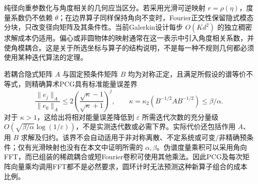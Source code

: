 纯径向重参数化与角度相关的几何应当区分。若采用光滑可逆映射 $r=\rho(\eta)$，度量系数仍不依赖 $\theta$；在边界算子同样保持角向不变时，Fourier正交性保留隐式模态分块，只改变径向矩阵及其条件性。当前Galerkin设计每步 $O(Kd^2)$ 的独立稠密求解成本仍适用。偏心或非圆物体的映射通常在这一表示中引入角度相关系数，并使角模耦合。这是关于所选坐标与算子的结构说明，不是每一种不规则几何都必须使用某种迭代算法的定理。

若耦合隐式矩阵 $A$ 与固定预条件矩阵 $B$ 均为对称正定，且满足所假设的谱等价不等式，则精确算术PCG具有标准能量误差界\cite{r21}
\begin{equation}
 \frac{\|e_j\|_A}{\|e_0\|_A}
 \leq2\left(\frac{\sqrt{\kappa}-1}{\sqrt{\kappa}+1}\right)^j,
 \qquad \kappa=\kappa_2(B^{-1/2}AB^{-1/2})\leq\beta/\alpha.
 \label{eq:geometry-pcg-bound}
\end{equation}
对于 $\kappa>1$，这给出将相对能量误差降低到 $\varepsilon$ 所需迭代次数的充分量级 $O(\sqrt{\beta/\alpha}\log(1/\varepsilon))$，不是实测迭代数或必需下界。实际代价还包括作用 $A$、用 $B$ 求解及归约。该界不会自动适用于非对称离散、不定系统或可变/非精确预条件；仅有光滑映射也没有在本文中证明所需的 $\alpha,\beta$。伪谱度量乘积可以采用角向FFT，而已组装的稀疏耦合或短Fourier卷积可使用其他乘法。因此PCG及每次矩阵向量乘均调用FFT都不是必然要求，圆环计时无法预测这种新算子组合的成本比例。
